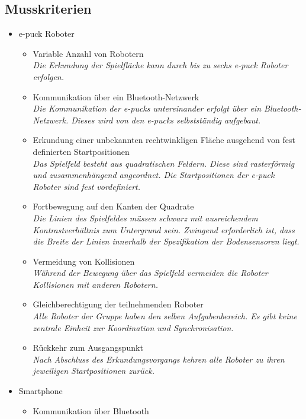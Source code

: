\documentclass[10pt,a4paper]{article}
\begin{document}
		\subsection{Musskriterien}
			\begin{itemize}
				\item e-puck Roboter
				\begin{itemize}
					\item Variable Anzahl von Robotern
						\\ \textsl{Die Erkundung der Spielfläche kann durch bis zu sechs e-puck Roboter erfolgen.}
					\item Kommunikation über ein Bluetooth-Netzwerk
						\\ \textsl{Die Kommunikation der e-pucks untereinander erfolgt über ein Bluetooth-Netzwerk.
						   Dieses wird von den e-pucks selbstständig aufgebaut.}
					\item Erkundung einer unbekannten rechtwinkligen Fläche ausgehend von fest definierten Startpositionen
						\\ \textsl{Das Spielfeld besteht aus quadratischen Feldern. Diese sind rasterförmig und
						   zusammenhängend angeordnet. Die Startpositionen der e-puck Roboter sind fest vordefiniert.}
					\item Fortbewegung auf den Kanten der Quadrate
						\\ \textsl{Die Linien des Spielfeldes müssen schwarz mit ausreichendem Kontrastverhältnis
						    zum Untergrund sein. Zwingend erforderlich ist, dass die Breite der Linien innerhalb der Spezifikation der
							Bodensensoren liegt.}		
					\item Vermeidung von Kollisionen
						\\ \textsl{Während der Bewegung über das Spielfeld vermeiden die Roboter Kollisionen mit anderen Robotern.}	
					\item Gleichberechtigung der teilnehmenden Roboter
						\\ \textsl{Alle Roboter der Gruppe haben den selben Aufgabenbereich. Es gibt keine zentrale Einheit
							zur Koordination und Synchronisation.}	
					\item Rückkehr zum Ausgangspunkt
						\\ \textsl{Nach Abschluss des Erkundungsvorgangs kehren alle Roboter zu ihren jeweiligen Startpositionen
							zurück.}	
				\end{itemize}
				\item Smartphone
				\begin{itemize}
					\item Kommunikation über Bluetooth

\end{itemize}
\end{itemize}
\end{document}
